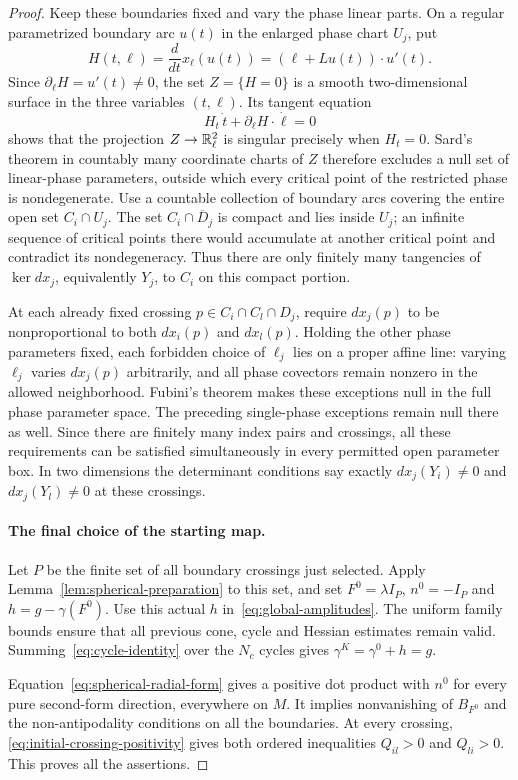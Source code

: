 \begin{proof}
Keep these boundaries fixed and vary the phase linear parts.  On a regular
parametrized boundary arc $u(t)$ in the enlarged phase chart $U_j$, put
\[
 H(t,\ell)=\frac{d}{dt}x_\ell(u(t))
           =(\ell+Lu(t))\cdot u'(t).
\]
Since $\partial_\ell H=u'(t)\ne0$, the set $Z=\{H=0\}$ is a smooth
two-dimensional surface in the three variables $(t,\ell)$.
Its tangent equation
\[
 H_t\,\dot t+\partial_\ell H\cdot\dot\ell=0
\]
shows that the projection $Z\to\mathbb{R}^2_\ell$ is singular precisely when
$H_t=0$.  Sard's theorem in countably many coordinate charts of $Z$
therefore excludes a null set of linear-phase parameters, outside which
every critical point of the restricted phase is nondegenerate.
Use a countable collection of boundary arcs covering the entire open
set $C_i\cap U_j$.  The set $C_i\cap\overline D_j$ is compact and lies
inside $U_j$; an infinite sequence of critical points there would
accumulate at another critical point and contradict its nondegeneracy.
Thus there are only finitely many tangencies of $\ker dx_j$, equivalently
$Y_j$, to $C_i$ on this compact portion.

At each already fixed crossing $p\in C_i\cap C_l\cap D_j$, require
$dx_j(p)$ to be nonproportional to both $dx_i(p)$ and $dx_l(p)$.
Holding the other phase parameters fixed, each forbidden choice of
$\ell_j$ lies on a proper affine line: varying $\ell_j$ varies
$dx_j(p)$ arbitrarily, and all phase covectors remain nonzero in the
allowed neighborhood.  Fubini's theorem makes these exceptions null
in the full phase parameter space.  The preceding single-phase
exceptions remain null there as well.  Since there are finitely many
index pairs and crossings, all these requirements can be satisfied
simultaneously in every permitted open parameter box.
In two dimensions the determinant conditions say exactly
$dx_j(Y_i)\ne0$ and $dx_j(Y_l)\ne0$ at these crossings.

\paragraph{The final choice of the starting map.}
Let $P$ be the finite set of all boundary crossings just selected.  Apply
Lemma~\ref{lem:spherical-preparation} to this set, and set
$F^0=\lambda I_P$, $n^0=-I_P$ and $h=g-\gamma(F^0)$.
Use this actual $h$ in~\eqref{eq:global-amplitudes}.  The uniform family
bounds ensure that all previous cone, cycle and Hessian estimates remain
valid.  Summing~\eqref{eq:cycle-identity} over the $N_c$ cycles gives
$\gamma^K=\gamma^0+h=g$.

Equation~\eqref{eq:spherical-radial-form} gives a positive dot product
with $n^0$ for every pure second-form direction, everywhere on $M$.
It implies nonvanishing of $B_{F^0}$ and the non-antipodality conditions
on all the boundaries.  At every crossing,
\eqref{eq:initial-crossing-positivity} gives both ordered inequalities
$Q_{il}>0$ and $Q_{li}>0$.  This proves all the assertions.
\end{proof}

